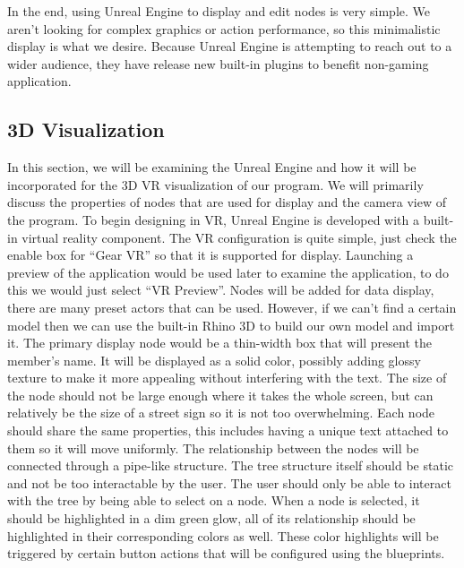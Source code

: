 \documentclass[onecolumn, draftclsnofoot, 10pt, compsoc]{IEEEtran}
\begin{document}
\begin{singlespace}
\newline
\newline
In the end, using Unreal Engine to display and edit nodes is very simple. We aren’t looking for complex graphics or action performance, so this minimalistic display is what we desire. Because Unreal Engine is attempting to reach out to a wider audience, they have release new built-in plugins to benefit non-gaming application.

\end{singlespace}

\subsection{3D Visualization}
\begin{singlespace}
In this section, we will be examining the Unreal Engine and how it will be incorporated for the 3D VR visualization of our program. We will primarily discuss the properties of nodes that are used for display and the camera view of the program.
\newline
\newline
To begin designing in VR, Unreal Engine is developed with a built-in virtual reality component. The VR configuration is quite simple, just check the enable box for “Gear VR” so that it is supported for display. Launching a preview of the application would be used later to examine the application, to do this we would just select “VR Preview”.
\newline
\newline
Nodes will be added for data display, there are many preset actors that can be used. However, if we can’t find a certain model then we can use the built-in Rhino 3D to build our own model and import it. The primary display node would be a thin-width box that will present the member’s name. It will be displayed as a solid color, possibly adding glossy texture to make it more appealing without interfering with the text. The size of the node should not be large enough where it takes the whole screen, but can relatively be the size of a street sign so it is not too overwhelming. Each node should share the same properties, this includes having a unique text attached to them so it will move uniformly.
\newline
\newline
The relationship between the nodes will be connected through a pipe-like structure. The tree structure itself should be static and not be too interactable by the user. The user should only be able to interact with the tree by being able to select on a node. When a node is selected, it should be highlighted in a dim green glow, all of its relationship should be highlighted in their corresponding colors as well. These color highlights will be triggered by certain button actions that will be configured using the blueprints.

\end{singlespace}
\end{document}
